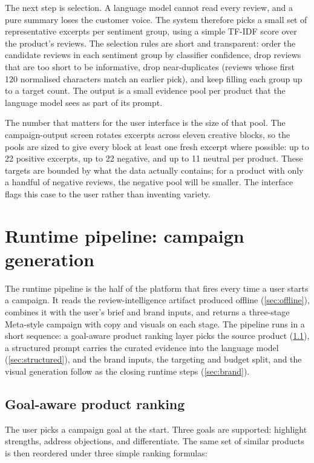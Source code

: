 \documentclass[12pt,a4paper]{report}
\begin{document}
The next step is selection. A language model cannot read every review, and a pure summary loses the customer voice. The system therefore picks a small set of representative excerpts per sentiment group, using a simple TF-IDF score over the product's reviews. The selection rules are short and transparent: order the candidate reviews in each sentiment group by classifier confidence, drop reviews that are too short to be informative, drop near-duplicates (reviews whose first 120 normalised characters match an earlier pick), and keep filling each group up to a target count. The output is a small evidence pool per product that the language model sees as part of its prompt.

The number that matters for the user interface is the size of that pool. The campaign-output screen rotates excerpts across eleven creative blocks, so the pools are sized to give every block at least one fresh excerpt where possible: up to 22 positive excerpts, up to 22 negative, and up to 11 neutral per product. These targets are bounded by what the data actually contains; for a product with only a handful of negative reviews, the negative pool will be smaller. The interface flags this case to the user rather than inventing variety.

\section{Runtime pipeline: campaign generation}
\label{sec:runtime}

The runtime pipeline is the half of the platform that fires every time a user starts a campaign. It reads the review-intelligence artifact produced offline (\cref{sec:offline}), combines it with the user's brief and brand inputs, and returns a three-stage Meta-style campaign with copy and visuals on each stage. The pipeline runs in a short sequence: a goal-aware product ranking layer picks the source product (\cref{sec:ranking}), a structured prompt carries the curated evidence into the language model (\cref{sec:structured}), and the brand inputs, the targeting and budget split, and the visual generation follow as the closing runtime steps (\cref{sec:brand}).

\subsection{Goal-aware product ranking}
\label{sec:ranking}

The user picks a campaign goal at the start. Three goals are supported: highlight strengths, address objections, and differentiate. The same set of similar products is then reordered under three simple ranking formulas:
\end{document}
